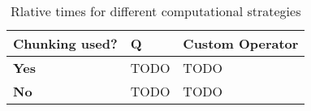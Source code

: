 \begin{table}
  \centering
  \begin{tabular}{|l|l|l|} \hline \hline
    {\bf Chunking used?}    & {\bf Q} & {\bf Custom Operator} \\ \hline \hline
    {\bf Yes} & TODO & TODO \\ \hline
    {\bf No} & TODO & TODO \\ \hline
    \hline
  \end{tabular}
  \caption{Rlative times for different computational strategies}
\end{table}
